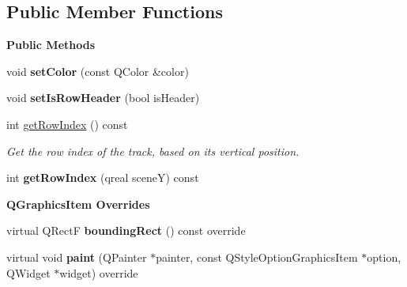 \subsection*{Public Member Functions}
\begin{Indent}\textbf{ Public Methods}\par
\begin{DoxyCompactItemize}
\item 
\mbox{\label{classrev_1_1_view_1_1_timeline_marker_a4c3b8f4a7383cb03995709874a163359}} 
void {\bfseries set\+Color} (const Q\+Color \&color)
\item 
\mbox{\label{classrev_1_1_view_1_1_timeline_marker_aa8db54a6ba47ffd094cf277ce8450bde}} 
void {\bfseries set\+Is\+Row\+Header} (bool is\+Header)
\item 
\mbox{\label{classrev_1_1_view_1_1_timeline_marker_adb94ada833d07661b961b6728f8e6901}} 
int \mbox{\hyperlink{classrev_1_1_view_1_1_timeline_marker_adb94ada833d07661b961b6728f8e6901}{get\+Row\+Index}} () const
\begin{DoxyCompactList}\small\item\em Get the row index of the track, based on it\textquotesingle{}s vertical position. \end{DoxyCompactList}\item 
\mbox{\label{classrev_1_1_view_1_1_timeline_marker_ae3375edbd1c2d9d4dab5a29b0dd4cab9}} 
int {\bfseries get\+Row\+Index} (qreal sceneY) const
\end{DoxyCompactItemize}
\end{Indent}
\begin{Indent}\textbf{ Q\+Graphics\+Item Overrides}\par
\begin{DoxyCompactItemize}
\item 
\mbox{\label{classrev_1_1_view_1_1_timeline_marker_af63c6f445edce7f0ee189a2d122311ef}} 
virtual Q\+RectF {\bfseries bounding\+Rect} () const override
\item 
\mbox{\label{classrev_1_1_view_1_1_timeline_marker_a08d05a6da02f895e6b48f6f2dea7e0e9}} 
virtual void {\bfseries paint} (Q\+Painter $\ast$painter, const Q\+Style\+Option\+Graphics\+Item $\ast$option, Q\+Widget $\ast$widget) override
\end{DoxyCompactItemize}
\end{Indent}
